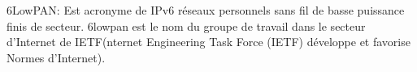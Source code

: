 \item 6LowPAN: Est acronyme de IPv6 réseaux personnels sans fil de basse puissance finis de secteur. 6lowpan est le nom du groupe de travail dans le secteur d'Internet de IETF(nternet Engineering Task Force (IETF) développe et favorise Normes d'Internet).